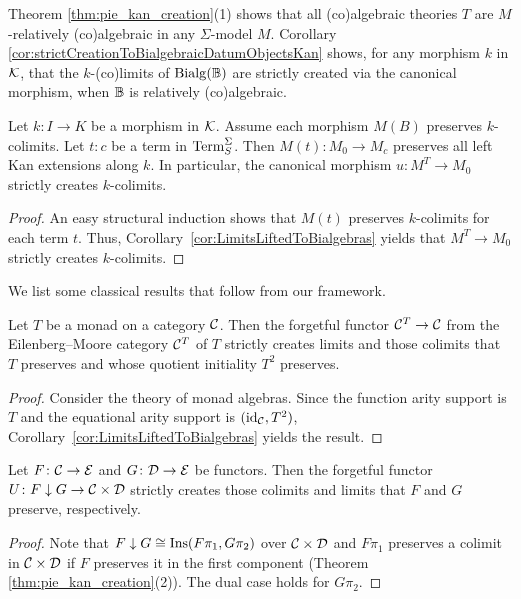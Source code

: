 Theorem \ref{thm:pie_kan_creation}(1) shows that all (co)algebraic theories $T$ are $M$-relatively (co)algebraic in any $\Sigma$-model $M$. Corollary \ref{cor:strictCreationToBialgebraicDatumObjectsKan} shows, for any morphism $k$ in $\mathcal{K}$, that the $k$-(co)limits of $\mathrm{Bialg}(\mathbb{B})$ are strictly created via the canonical morphism, when $\mathbb{B}$ is relatively (co)algebraic.

\begin{corollary}\label{cor:limitPreservationFromAtomicPreservation}
Let $k\colon I\to K$ be a morphism in $\mathcal{K}$. Assume each morphism $M(B)$ preserves $k$-colimits. Let $t\colon c$ be a term in $\mathrm{Term}_S^\Sigma$. Then $M(t)\colon M_0\to M_c$ preserves all left Kan extensions along $k$. In particular, the canonical morphism $u\colon M^T\to M_0$ strictly creates $k$-colimits.
\end{corollary}
\begin{proof}
   An easy structural induction shows that $M(t)$ preserves $k$-colimits for each term $t$. Thus, Corollary~\ref{cor:LimitsLiftedToBialgebras} yields that $M^T\to M_0$ strictly creates $k$-colimits. 
\end{proof}

We list some classical results that follow from our framework.
\begin{corollary}
   Let $T$ be a monad on a category $\mathcal{C}$. Then the forgetful functor $\mathcal{C}^T\to \mathcal{C}$ from the Eilenberg--Moore category $\mathcal{C}^T$ of $T$ strictly creates limits and those colimits that $T$ preserves and whose quotient initiality $T^2$ preserves.
\end{corollary}
\begin{proof}
    Consider the theory of monad algebras. Since the function arity support is $T$ and the equational arity support is $(\mathrm{id}_{\mathcal{C}}, T^2)$, Corollary~\ref{cor:LimitsLiftedToBialgebras} yields the result.
\end{proof}

\begin{corollary}
   Let $F\colon \mathcal{C}\to \mathcal{E}$ and $G\colon \mathcal{D}\to \mathcal{E}$ be functors. Then the forgetful functor $U\colon F\downarrow G\to \mathcal{C}\times \mathcal{D}$ strictly creates those colimits and limits that $F$ and $G$ preserve, respectively.
\end{corollary}
\begin{proof}
    Note that $F\downarrow G\cong \mathrm{Ins}(F\pi_1,G\pi_2)$ over $\mathcal{C}\times \mathcal{D}$ and $F\pi_1$ preserves a colimit in $\mathcal{C}\times\mathcal{D}$ if $F$ preserves it in the first component (Theorem \ref{thm:pie_kan_creation}(2)). The dual case holds for $G\pi_2$.
\end{proof}

